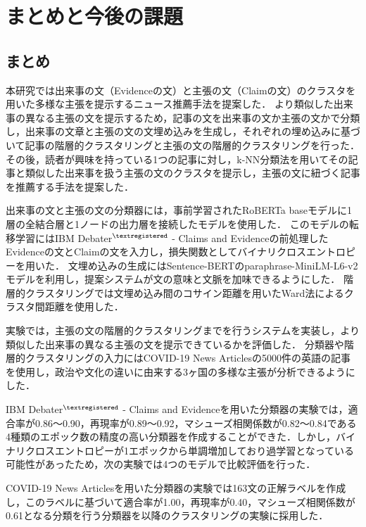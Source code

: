 \documentclass[12pt,a4j,dvipdfmx]{jreport}
\begin{document}
\chapter{まとめと今後の課題}
\label{chapter_conclusion}

\section{まとめ}
本研究では出来事の文（Evidenceの文）と主張の文（Claimの文）のクラスタを用いた多様な主張を提示するニュース推薦手法を提案した．
より類似した出来事の異なる主張の文を提示するため，記事の文を出来事の文か主張の文かで分類し，出来事の文章と主張の文の文埋め込みを生成し，それぞれの埋め込みに基づいて記事の階層的クラスタリングと主張の文の階層的クラスタリングを行った．
その後，読者が興味を持っている1つの記事に対し，k-NN分類法を用いてその記事と類似した出来事を扱う主張の文のクラスタを提示し，主張の文に紐づく記事を推薦する手法を提案した．

出来事の文と主張の文の分類器には，事前学習されたRoBERTa baseモデルに1層の全結合層と1ノードの出力層を接続したモデルを使用した．
このモデルの転移学習にはIBM Debater$^{\textregistered}$ - Claims and Evidenceの前処理したEvidenceの文とClaimの文を入力し，損失関数としてバイナリクロスエントロピーを用いた．
文埋め込みの生成にはSentence-BERTのparaphrase-MiniLM-L6-v2モデルを利用し，提案システムが文の意味と文脈を加味できるようにした．
階層的クラスタリングでは文埋め込み間のコサイン距離を用いたWard法によるクラスタ間距離を使用した．

実験では，主張の文の階層的クラスタリングまでを行うシステムを実装し，より類似した出来事の異なる主張の文を提示できているかを評価した．
分類器や階層的クラスタリングの入力にはCOVID-19 News Articlesの5000件の英語の記事を使用し，政治や文化の違いに由来する3ヶ国の多様な主張が分析できるようにした．

IBM Debater$^{\textregistered}$ - Claims and Evidenceを用いた分類器の実験では，適合率が0.86～0.90，再現率が0.89～0.92，マシューズ相関係数が0.82～0.84である4種類のエポック数の精度の高い分類器を作成することができた．しかし，バイナリクロスエントロピーが1エポックから単調増加しており過学習となっている可能性があったため，次の実験では4つのモデルで比較評価を行った．

COVID-19 News Articlesを用いた分類器の実験では163文の正解ラベルを作成し，このラベルに基づいて適合率が1.00，再現率が0.40，マシューズ相関係数が0.61となる分類を行う分類器を以降のクラスタリングの実験に採用した．
\end{document}
